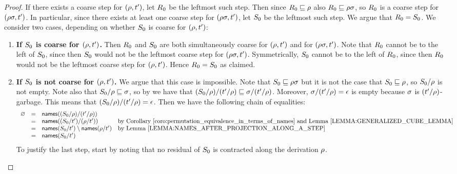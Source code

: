 \begin{proof}
If there exists a coarse step for $(\rho,t')$,
let $R_0$ be the leftmost such step.
Then since $R_0 \sqsubseteq \rho$ also $R_0 \sqsubseteq \rho\sigma$,
so $R_0$ is a coarse step for $(\rho\sigma,t')$.
In particular, since there exists at least one coarse step for $(\rho\sigma,t')$,
let $S_0$ be the leftmost such step.
We argue that $R_0 = S_0$.
We consider two cases, depending on whether $S_0$ is coarse for $(\rho,t')$:
\begin{enumerate}
\item {\bf If $S_0$ is coarse for $(\rho,t')$.}
  Then $R_0$ and $S_0$ are both simultaneously
  coarse for $(\rho,t')$ and for $(\rho\sigma,t')$.
  Note that $R_0$ cannot be to the left of $S_0$,
  since then $S_0$ would not be the leftmost coarse step for $(\rho\sigma,t')$.
  Symmetrically, $S_0$ cannot be to the left of $R_0$,
  since then $R_0$ would not be the leftmost coarse step for $(\rho,t')$.
  Hence $R_0 = S_0$ as claimed.
\item {\bf If $S_0$ is not coarse for $(\rho,t')$.}
  We argue that this case is impossible.
  Note that $S_0 \sqsubseteq \rho\sigma$ but it is not the case that $S_0 \sqsubseteq \rho$,
  so $S_0/\rho$ is not empty.
  Note also that $S_0/\rho \sqsubseteq \sigma$,
  so by 
  we have that $(S_0/\rho)/(t'/\rho) \sqsubseteq \sigma/(t'/\rho)$.
  Moreover, $\sigma/(t'/\rho) = \epsilon$ is empty because $\sigma$ is $(t'/\rho)$-garbage.
  This means that $(S_0/\rho)/(t'/\rho) = \epsilon$.
  Then we have the following chain of equalities:
  \[
    \begin{array}{rcll}
      \emptyset & = & \names((\redextwo_0/\redseq)/(\tm'/\redseq)) \\
                & = & \names((\redextwo_0/\tm')/(\redseq/\tm'))               & \text{by \rcoro{permutation_equivalence_in_terms_of_names} and \rlem{generalized_cube_lemma}} \\
                & = & \names(\redextwo_0/\tm') \setminus \names(\redseq/\tm') & \text{by \rlem{names_after_projection_along_a_step}} \\
                & = & \names(\redextwo_0/\tm')
    \end{array}
  \]
  To justify the last step, start by noting that no residual of $S_0$ is contracted along the derivation $\rho$.

\end{enumerate}
\end{proof}
